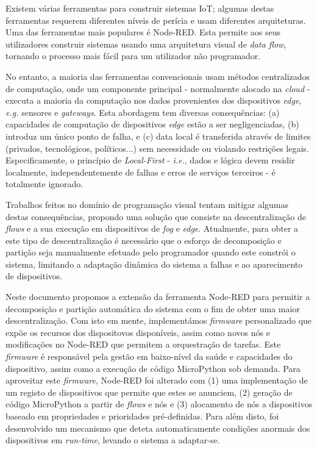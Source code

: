 Existem várias ferramentas para construir sistemas IoT; algumas destas ferramentas requerem diferentes níveis de perícia e usam diferentes arquiteturas. Uma das ferramentas mais populares é Node-RED. Esta permite aos seus utilizadores construir sistemas usando uma arquitetura visual de \emph{data flow}, tornando o processo mais fácil para um utilizador não programador.

No entanto, a maioria das ferramentas convencionais usam métodos centralizados de computação, onde um componente principal - normalmente alocado na \emph{cloud} - executa a maioria da computação nos dados provenientes dos dispositivos \emph{edge}, \emph{e.g.} sensores e \emph{gateways}. Esta abordagem tem diversas consequências: (a) capacidades de computação de dispositivos \emph{edge} estão a ser negligenciadas, (b) introduz um único ponto de falha, e (c) data local é transferida através de limites (privados, tecnológicos, políticos...) sem necessidade ou violando restrições legais. Especificamente, o princípio de \emph{Local-First} - \emph{i.e.}, dados e lógica devem residir localmente, independentemente de falhas e erros de serviços terceiros - é totalmente ignorado.

Trabalhos feitos no domínio de programação visual tentam mitigar algumas destas consequências, propondo uma solução que consiste na descentralização de \emph{flows} e a sua execução em dispositivos de \emph{fog} e \emph{edge}. Atualmente, para obter a este tipo de descentralização é necessário que o esforço de decomposição e partição seja manualmente efetuado pelo programador quando este constrói o sistema, limitando a adaptação dinâmica do sistema a falhas e ao aparecimento de dispositivos.

Neste documento propomos a extensão da ferramenta Node-RED para permitir a decomposição e partição automática do sistema com o fim de obter uma maior descentralização. Com isto em mente, implementámos \textit{firmware} personalizado que expõe os recursos dos dispositovos disponíveis, assim como novos nós e modificações no Node-RED que permitem a orquestração de tarefas. Este \textit{firmware} é responsável pela gestão em baixo-nível da saúde e capacidades do dispositivo, assim como a execução de código MicroPython sob demanda. Para aproveitar este \textit{firmware}, Node-RED foi alterado com (1) uma implementação de um registo de dispositivos que permite que estes se anunciem, (2) geração de código MicroPython a partir de \textit{flows} e nós e (3) alocamento de nós a dispositivos baseado em propriedades e prioridades pré-definidas. Para além disto, foi desenvolvido um mecanismo que deteta automaticamente condições anormais dos dispositivos em \emph{run-time}, levando o sistema a adaptar-se.


